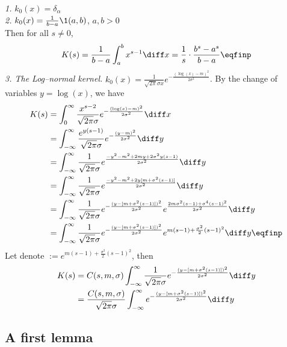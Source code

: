 \textit{1.} $k_0(x) = \delta_\alpha$ \\
\textit{2.} $k_0(x) = \frac{1}{b-a}\1{(a,b)}$, $a,b > 0$ \\
Then for all $s \neq 0$, 
    \begin{align*}
        K(s) = \frac{1}{b-a}\int_a^b x^{s-1}\diff x = \frac1s \cdot\frac{b^s - a^s}{b-a}
        \eqfinp
    \end{align*}
\textit{3. The Log--normal kernel.} $k_0(x) = \frac{1}{\sqrt{2\pi}\sigma x} e^{-\frac{(\log(x)-m)^2}{2\sigma^2}}$.
By the change of variables $y = \log(x)$, we have
    \begin{align*}
        K(s) 
        &= \int_0^\infty \frac{x^{s-2}}{\sqrt{2\pi}\sigma} e^{-\frac{(\log(x)-m)^2}{2\sigma^2}} \diff x \\
        &= \int_{-\infty}^\infty \frac{e^{y(s-1)}}{\sqrt{2\pi}\sigma} e^{-\frac{(y-m)^2}{2\sigma^2}} \diff y \\
        &=  \int_{-\infty}^\infty \frac{1}{\sqrt{2\pi}\sigma} e^{\frac{-y^2 - m^2 + 2m y + 2\sigma^2 y(s-1)}{2\sigma^2}} \diff y \\
        &=  \int_{-\infty}^\infty \frac{1}{\sqrt{2\pi}\sigma} e^{\frac{-y^2 - m^2 + 2y[m + \sigma^2 (s-1)]}{2\sigma^2}} \diff y \\
        &=  \int_{-\infty}^\infty \frac{1}{\sqrt{2\pi}\sigma} 
        e^{-\frac{(y - [m + \sigma^2 (s-1)])^2}{2\sigma^2}}
        e^{\frac{2m \sigma^2(s-1)+\sigma^4(s-1)^2}{2\sigma^2}}\diff y \\
        &=  \int_{-\infty}^\infty \frac{1}{\sqrt{2\pi}\sigma} 
        e^{-\frac{(y - [m + \sigma^2 (s-1)])^2}{2\sigma^2}}
        e^{m (s-1)+\frac{\sigma^2}{2}(s-1)^2}\diff y
        \eqfinp
    \end{align*}
Let denote $  := e^{m (s-1)+\frac{\sigma^2}{2}(s-1)^2}$, then 
\begin{align*}
    K(s) 
    &=  C(s,m,\sigma) \int_{-\infty}^\infty \frac{1}{\sqrt{2\pi}\sigma} 
        e^{-\frac{(y - [m + \sigma^2 (s-1)])^2}{2\sigma^2}}\diff y
        \\
        &=  \frac{C(s,m,\sigma)}{\sqrt{2\pi}\sigma} \int_{-\infty}^\infty
        e^{-\frac{(y - [m + \sigma^2 (s-1)])^2}{2\sigma^2}}\diff y
\end{align*}



\subsection{A first lemma}

